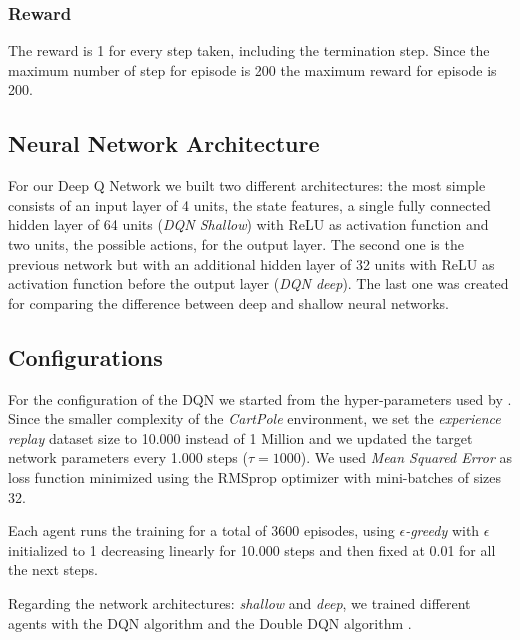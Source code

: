 \subsubsection{Reward}
The reward is 1 for every step taken, including the termination step. Since the maximum number of step for episode is 200 the maximum reward for episode is 200.


\subsection{Neural Network Architecture}

For our Deep Q Network we built two different architectures: the most simple consists of an input layer of 4 units, the state features, a single fully connected hidden layer of 64 units (\textit{DQN Shallow}) with ReLU as activation function and two units, the possible actions, for the output layer. The second one is the previous network but with an additional hidden layer of 32 units with ReLU as activation function before the output layer (\textit{DQN deep}). %
The last one was created for comparing the difference between deep and shallow neural networks.

\subsection{Configurations}

For the configuration of the DQN we started from the hyper-parameters used by \citeauthor{Hasselt:2016:DRL:3016100.3016191} . Since the smaller complexity of the \textit{CartPole} environment, we set the \textit{experience replay} dataset size  to 10.000 instead of 1 Million and we updated the target network parameters every 1.000 steps ($\tau = 1000$). We used \textit{Mean Squared Error} as loss function minimized using the RMSprop optimizer with mini-batches of sizes 32.

Each agent runs the training for a total of 3600 episodes, using \textit{$\epsilon$-greedy} with $\epsilon$ initialized to 1 decreasing linearly for 10.000 steps and then fixed at 0.01 for all the next steps.

Regarding the network architectures: \textit{shallow} and \textit{deep}, we trained different agents with the DQN algorithm \cite{Mnih2015} and the Double DQN algorithm \cite{Hasselt:2016:DRL:3016100.3016191}.

